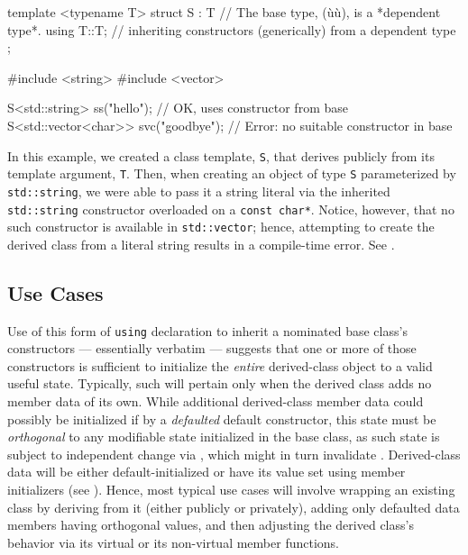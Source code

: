 \begin{emcppslisting}[language=C++]
template <typename T>
struct S : T  // The base type, (ù{}ù), is a *dependent type*.
{
    using T::T;  // inheriting constructors (generically) from a dependent type
};

#include <string>
#include <vector>

S<std::string>        ss("hello");    // OK, uses constructor from base
S<std::vector<char>> svc("goodbye");  // Error: no suitable constructor in base
\end{emcppslisting}
    
\noindent In this example, we created a class template, \lstinline!S!, that
derives publicly from its template argument, \lstinline!T!. Then, when
creating an object of type \lstinline!S! parameterized by
\lstinline!std::string!, we were able to pass it a string literal via
the inherited \lstinline!std::string! constructor overloaded on a
\lstinline!const!~\lstinline!char*!. Notice, however, that no such constructor
is available in \lstinline!std::vector!; hence, attempting to create the
derived class from a literal string results in a compile-time error. See . 

\subsection[Use Cases]{Use Cases}\label{use-cases-ctorinheriting}
\label{abstract-use-case}

Use of this form of \lstinline!using! declaration to inherit a nominated
base class's constructors --- essentially verbatim --- suggests that one
or more of those constructors is sufficient to initialize the
\emph{entire} derived-class object to a valid useful state. Typically,
such will pertain only when the derived class adds no member data of its
own. While additional derived-class member data could possibly
be initialized if by a \emph{defaulted} default constructor, this state must be \emph{orthogonal} to
any modifiable state initialized in the base class, as such state is
subject to independent change via , which might in turn
invalidate . Derived-class data will be either default-initialized or have its value set using member
initializers (see ).  
Hence, most typical use cases will involve wrapping an
existing class by deriving from it (either publicly or privately),
adding only defaulted data members having orthogonal values, and then
adjusting the derived class's behavior via  its virtual
or  its non-virtual member functions.

